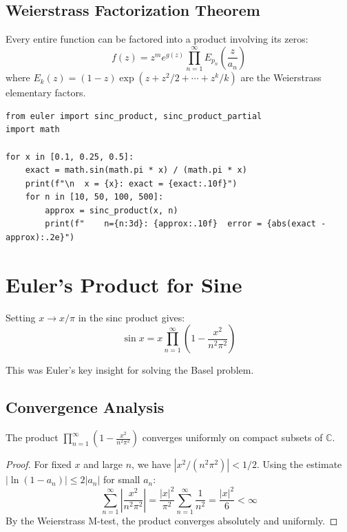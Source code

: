 \subsection{Weierstrass Factorization Theorem}

\begin{theorem}[Weierstrass]
Every entire function can be factored into a product involving its zeros:
\[
f(z) = z^m e^{g(z)} \prod_{n=1}^{\infty} E_{p_n}\left(\frac{z}{a_n}\right)
\]
where $E_k(z) = (1-z)\exp(z + z^2/2 + \cdots + z^k/k)$ are the Weierstrass elementary factors.
\end{theorem}

\begin{lstlisting}[caption={Sinc product}, label=lst:sinc]
from euler import sinc_product, sinc_product_partial
import math

for x in [0.1, 0.25, 0.5]:
    exact = math.sin(math.pi * x) / (math.pi * x)
    print(f"\n  x = {x}: exact = {exact:.10f}")
    for n in [10, 50, 100, 500]:
        approx = sinc_product(x, n)
        print(f"    n={n:3d}: {approx:.10f}  error = {abs(exact - approx):.2e}")
\end{lstlisting}

\section{Euler's Product for Sine}

Setting $x \to x/\pi$ in the sinc product gives:
\[
\sin x = x \prod_{n=1}^\infty \left(1 - \frac{x^2}{n^2 \pi^2}\right)
\]

This was Euler's key insight for solving the Basel problem.

\subsection{Convergence Analysis}

\begin{theorem}
The product $\prod_{n=1}^{\infty}\left(1 - \frac{x^2}{n^2\pi^2}\right)$ converges uniformly on compact subsets of $\mathbb{C}$.
\end{theorem}

\begin{proof}
For fixed $x$ and large $n$, we have $|x^2/(n^2\pi^2)| < 1/2$. Using the estimate
$|\ln(1 - a_n)| \leq 2|a_n|$ for small $a_n$:
\[
\sum_{n=1}^{\infty} \left|\frac{x^2}{n^2\pi^2}\right| = \frac{|x|^2}{\pi^2}\sum_{n=1}^{\infty}\frac{1}{n^2} = \frac{|x|^2}{6} < \infty
\]
By the Weierstrass M-test, the product converges absolutely and uniformly.
\end{proof}

